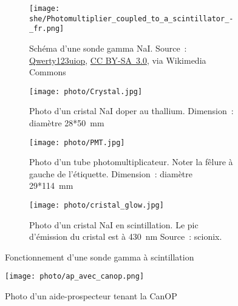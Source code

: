 \begin{figure}

    \begin{subfigure}{1\textwidth}
        \centering
        \texttt{[image: she/Photomultiplier\_coupled\_to\_a\_scintillator\_-\_fr.png]}
        \caption[Shema d'une sonde gamma NaI]{Schéma d'une sonde gamma NaI. Source~: \href{https://commons.wikimedia.org/wiki/File:Photomultiplier_coupled_to_a_scintillator_-_fr.png}{Qwerty123uiop}, \href{https://creativecommons.org/licenses/by-sa/3.0}{CC BY-SA~3.0}, via Wikimedia Commons}
        \label{fig_detecteur_gamma}
    \end{subfigure}
    \begin{subfigure}[t]{0.32\textwidth}
        \centering
        \texttt{[image: photo/Crystal.jpg]}

        \caption[Photo d'un cristal NaI]{Photo d'un cristal NaI doper au thallium. Dimension~: diamètre 28*50~mm}
        \label{fig_Nai}
    \end{subfigure}
    \begin{subfigure}[t]{0.32\textwidth}
        \centering
        \texttt{[image: photo/PMT.jpg]}

        \caption[Photo d'un tube photomultiplicateur]{Photo d'un tube photomultiplicateur. Noter la fêlure à gauche de l'étiquette. Dimension~: diamètre 29*114~mm}
        \label{fig_PMT}
    \end{subfigure}
    \begin{subfigure}[t]{0.32\textwidth}
        \centering
        \texttt{[image: photo/cristal\_glow.jpg]}
        \caption[Photo d'un cristal NaI en scintillation]{Photo d'un cristal NaI en scintillation. Le pic d'émission du cristal est à 430~nm Source~: scionix.}
    \end{subfigure}
    \caption{Fonctionnement d'une sonde gamma à scintillation}

\end{figure}

\newpage

\begin{wrapfigure}{r}{0.4\textwidth}
    \centering
    \texttt{[image: photo/ap\_avec\_canop.png]}
    \caption{Photo d'un aide-prospecteur tenant la CanOP}
\end{wrapfigure}

